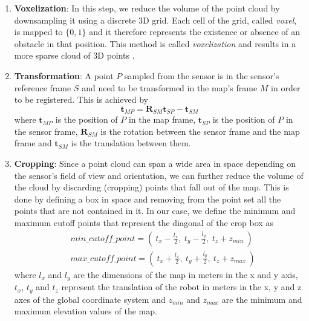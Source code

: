 \begin{enumerate}
    \item \textbf{Voxelization}:
        In this step, we reduce the volume of the point cloud by downsampling
        it using a discrete 3D grid.
        Each cell of the grid, called \textit{voxel}, is mapped to $\{0,1\}$
        and it therefore represents the existence or absence of an obstacle
        in that position.
        This method is called \textit{voxelization} and results in a more
        sparse cloud of 3D points \parencite{Hinks2013}.

    \item \textbf{Transformation}:
        A point $P$ sampled from the sensor is in the sensor's reference frame
        $S$ and need to be transformed in the map's frame $M$ in order to be
        registered.
        This is achieved by
        \begin{equation} \label{eq:point_cloud_tf}
            \mathbf{t}_{MP} =
                \mathbf{R}_{SM} \mathbf{t}_{SP} -
                \mathbf{t}_{SM}
        \end{equation}
        where
        $\mathbf{t}_{MP}$ is the position of $P$ in the map frame,
        $\mathbf{t}_{SP}$ is the position of $P$ in the sensor frame,
        $\mathbf{R}_{SM}$ is the rotation between the sensor frame and the
        map frame and
        $\mathbf{t}_{SM}$ is the translation between them.

    \item \textbf{Cropping}:
        Since a point cloud can span a wide area in space depending on the
        sensor's field of view and orientation, we can further reduce the
        volume of the cloud by discarding (cropping) points that fall out
        of the map.
        This is done by defining a box in space and removing
        from the point set all the points that are not contained in it.
        In our case, we define the minimum and maximum cutoff points that
        represent the diagonal of the crop box as
        \begin{equation}
        \begin{aligned}
            &min\_cutoff\_point =
                \left( \
                    t_x - \frac{l_x}{2}, \
                    t_y - \frac{l_y}{2}, \
                    t_z + z_{min} \
                \right) \\
            &max\_cutoff\_point =
                \left( \
                    t_x + \frac{l_x}{2}, \
                    t_y + \frac{l_y}{2}, \
                    t_z + z_{max} \
                \right)
        \end{aligned}
        \end{equation}
        where
        $l_x$ and $l_y$ are the dimensions of the map in meters in the
        x and y axis,
        $t_x$, $t_y$ and $t_z$ represent the translation of the robot in
        meters in the x, y and z axes of the global coordinate system and
        $z_{min}$ and $z_{max}$ are the minimum and maximum elevation values
        of the map.


\end{enumerate}
